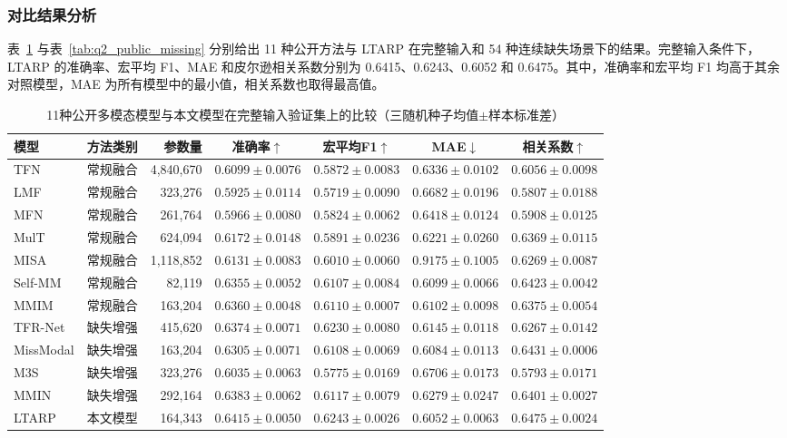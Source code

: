 \documentclass[UTF8,a4paper,11pt]{ctexart}
\begin{document}
\subsubsection{对比结果分析}
表~\ref{tab:q2_public_baselines} 与表~\ref{tab:q2_public_missing} 分别给出 11 种公开方法与 LTARP 在完整输入和 54 种连续缺失场景下的结果。完整输入条件下，LTARP 的准确率、宏平均 F1、MAE 和皮尔逊相关系数分别为 0.6415、0.6243、0.6052 和 0.6475。其中，准确率和宏平均 F1 均高于其余对照模型，MAE 为所有模型中的最小值，相关系数也取得最高值。

\begin{table}[htbp]
\centering\scriptsize\setlength{\tabcolsep}{2.25pt}
\caption{11种公开多模态模型与本文模型在完整输入验证集上的比较（三随机种子均值$\pm$样本标准差）}
\label{tab:q2_public_baselines}
\begin{tabular}{llrcccc}
\toprule
模型 & 方法类别 & 参数量 & 准确率$\uparrow$ & 宏平均F1$\uparrow$ & MAE$\downarrow$ & 相关系数$\uparrow$\\
\midrule
TFN & 常规融合 & 4,840,670 & $0.6099\pm0.0076$ & $0.5872\pm0.0083$ & $0.6336\pm0.0102$ & $0.6056\pm0.0098$\\
LMF & 常规融合 & 323,276 & $0.5925\pm0.0114$ & $0.5719\pm0.0090$ & $0.6682\pm0.0196$ & $0.5807\pm0.0188$\\
MFN & 常规融合 & 261,764 & $0.5966\pm0.0080$ & $0.5824\pm0.0062$ & $0.6418\pm0.0124$ & $0.5908\pm0.0125$\\
MulT & 常规融合 & 624,094 & $0.6172\pm0.0148$ & $0.5891\pm0.0236$ & $0.6221\pm0.0260$ & $0.6369\pm0.0115$\\
MISA & 常规融合 & 1,118,852 & $0.6131\pm0.0083$ & $0.6010\pm0.0060$ & $0.9175\pm0.1005$ & $0.6269\pm0.0087$\\
Self-MM & 常规融合 & 82,119 & $0.6355\pm0.0052$ & $0.6107\pm0.0084$ & $0.6099\pm0.0066$ & $0.6423\pm0.0042$\\
MMIM & 常规融合 & 163,204 & $0.6360\pm0.0048$ & $0.6110\pm0.0007$ & $0.6102\pm0.0098$ & $0.6375\pm0.0054$\\
\addlinespace\midrule
TFR-Net & 缺失增强 & 415,620 & $0.6374\pm0.0071$ & $0.6230\pm0.0080$ & $0.6145\pm0.0118$ & $0.6267\pm0.0142$\\
MissModal & 缺失增强 & 163,204 & $0.6305\pm0.0071$ & $0.6108\pm0.0069$ & $0.6084\pm0.0113$ & $0.6431\pm0.0006$\\
M3S & 缺失增强 & 323,276 & $0.6035\pm0.0063$ & $0.5775\pm0.0169$ & $0.6706\pm0.0173$ & $0.5793\pm0.0171$\\
MMIN & 缺失增强 & 292,164 & $0.6383\pm0.0062$ & $0.6117\pm0.0079$ & $0.6279\pm0.0247$ & $0.6401\pm0.0027$\\
\addlinespace\midrule
LTARP & 本文模型 & 164,343 & $0.6415\pm0.0050$ & $0.6243\pm0.0026$ & $0.6052\pm0.0063$ & $0.6475\pm0.0024$\\
\bottomrule
\end{tabular}
\end{table}
\end{document}
